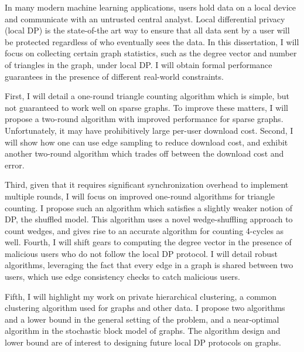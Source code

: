 \documentclass[12pt]{ucsddissertation}
\begin{document}
\begin{dissertationabstract}
In many modern machine learning applications, users hold data on a local device 
and communicate with an untrusted central analyst. Local differential privacy 
(local DP) is the state-of-the art way to ensure that all data sent by a user 
will be protected regardless of who eventually sees the data. In this dissertation,
I will focus on collecting certain graph statistics, such as the degree vector 
and number of triangles in the graph, under local DP. I will 
obtain formal performance guarantees in the presence of different real-world constraints.

First, I will detail a one-round triangle counting algorithm which is simple, but not guaranteed to work 
well on sparse graphs. To improve these matters,
I will propose a two-round algorithm with improved performance 
for sparse graphs. Unfortunately, it may have prohibitively large per-user 
download cost. Second, I will show how one can use 
edge sampling to reduce download cost, and exhibit another two-round algorithm which
trades off between the download cost and error.

Third, given that it requires significant synchronization overhead to implement multiple rounds, I will 
focus on improved one-round algorithms for triangle counting. I propose such an algorithm which satisfies a slightly weaker
notion of DP, the shuffled model. This algorithm uses a novel wedge-shuffling approach
to count wedges, and gives rise to an accurate algorithm for counting 
4-cycles as well. Fourth, I will shift gears to computing the degree vector in the presence
of malicious users who do not follow the local DP protocol. I will detail robust algorithms, 
leveraging the fact that every edge in a graph is shared between two users, which use 
edge consistency checks to catch malicious users.

Fifth, I will highlight my work on private hierarchical clustering,
a common clustering algorithm used for graphs and other data. I propose two algorithms and 
a lower bound in the general setting of the problem, and a near-optimal algorithm in the stochastic 
block model of graphs. The algorithm design and lower bound 
are of interest to designing future local DP protocols on graphs.

\end{dissertationabstract}

\mainmatter
\end{document}
